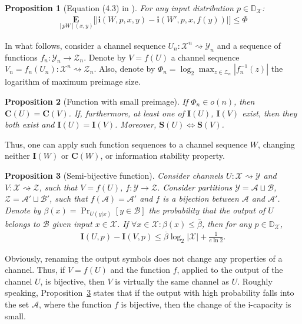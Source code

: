 \documentclass[journal, twocol]{IEEEtran}
\newcommand{\mA}{{\mathcal{A}}}
\newcommand{\mB}{{\mathcal{B}}}
\newcommand{\bfC}{{\mathbf{C}}}
\newcommand{\bD}{{\mathbb{D}}}
\newcommand{\bfE}{{\mathbf{E}}}
\newcommand{\bfI}{{\mathbf{I}}}
\newcommand{\bfS}{{\mathbf{S}}}
\newcommand{\mX}{{\mathcal{X}}}
\newcommand{\mY}{{\mathcal{Y}}}
\newcommand{\mZ}{{\mathcal{Z}}}
\newcommand{\abs}[1]{\left|{#1}\right|}
\newcommand{\brsq}[1]{{\left[{#1}\right]}}
\newcommand{\brabs}[1]{{\left|{#1}\right|}}
\newcommand{\tosq}{\rightsquigarrow}
\newcommand{\bi}{\mathbf{i}}
\newcommand{\obeta}{\overline{\beta}}
\newtheorem{proposition}{Proposition}
\newcommand{\pW}[2]{[{#1}{#2}]}
\begin{document}
\begin{proposition}[Equation (4.3) in \cite{dobrushin67shannons}]
\label{p:preimage}
For any input distribution $p\in\bD_{\mX}$:
\begin{align}
\underset{\pW{p}{W}(x,y)}{\bfE}\bigg[\brabs{\bi(W,p,x,y) - \bi(W',p,x,f(y))}\bigg]\leq \Phi
\label{eq:absi-i}
\end{align}
\end{proposition}

In what follows, consider a channel sequence $U_n:\mX^n\tosq\mY_n$ and a sequence of functions $f_n:\mY_n\to\mZ_n$.
Denote by $V=f(U)$ a channel sequence $V_n=f_n(U_n):\mX^n\tosq\mZ_n$.
Also, denote by $\Phi_n=\log_2\max_{z\in \mZ_n}\abs{f_n^{-1}(z)}$ the logarithm of maximum preimage size.

\begin{proposition}[Function with small preimage]
\label{p:invimage}
If $\Phi_n\in o(n)$, then $\bfC(U)=\bfC(V)$.
If, furthermore, at least one of $\bfI(U)$, $\bfI(V)$ exist, then they both exist and $\bfI(U)=\bfI(V)$.
Moreover, $\bfS(U)\iff\bfS(V)$.
\end{proposition}

Thus, one can apply such function sequences to a channel sequence $W$, changing neither $\bfI(W)$ or $\bfC(W)$, or information stability property.

\begin{proposition}[Semi-bijective function]
\label{p:prb}
Consider channels $U:\mX\tosq\mY$ and $V:\mX\tosq\mZ$, such that $V=f(U)$, $f:\mY\to\mZ$.
Consider partitions $\mY=\mA \sqcup \mB$, $\mZ=\mA' \sqcup \mB'$, such that $f(\mA)=\mA'$ and $f$ is a bijection between $\mA$ and $\mA'$.
Denote by $\beta(x)=\Pr_{U(y|x)}\brsq{y\in\mB}$ the probability that the output of $U$ belongs to $\mB$ given input $x\in\mX$.
If $\forall x\in\mX: \beta(x)\leq\obeta$, then for any $p\in\bD_\mX$,
\begin{align}
\bfI(U,p)-\bfI(V,p)\leq \obeta \log_2|\mX|+\frac{1}{e\ln 2}.
\label{eq:uvbeta}
\end{align}
\end{proposition}

Obviously, renaming the output symbols does not change any properties of a channel.
Thus, if $V=f(U)$ and the function $f$, applied to the output of the channel $U$, is bijective, then $V$ is virtually the same channel as $U$.
Roughly speaking, Proposition~\ref{p:prb} states that if the output with high probability falls into the set $\mA$, where the function $f$ is bijective, then the change of the i-capacity is small.
\end{document}
